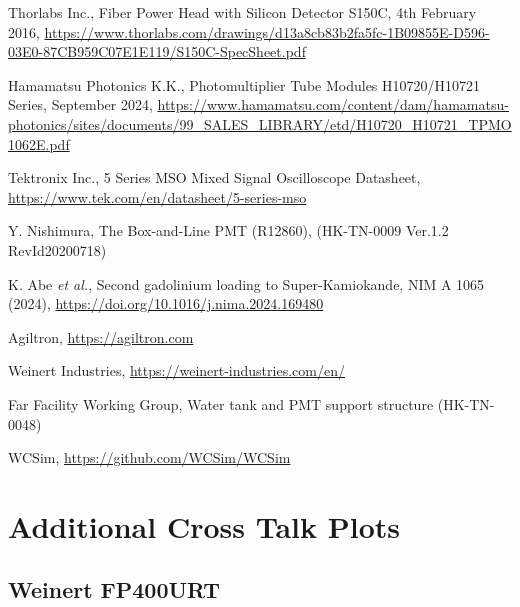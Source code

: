 \documentclass[a4paper,11pt]{article}
\begin{document}
\begin{thebibliography}{99}
Thorlabs Inc., Fiber Power Head with Silicon Detector S150C, 4th February 2016, \url{https://www.thorlabs.com/drawings/d13a8cb83b2fa5fc-1B09855E-D596-03E0-87CB959C07E1E119/S150C-SpecSheet.pdf}

Hamamatsu Photonics K.K., Photomultiplier Tube Modules H10720/H10721 Series, September 2024, \url{https://www.hamamatsu.com/content/dam/hamamatsu-photonics/sites/documents/99_SALES_LIBRARY/etd/H10720_H10721_TPMO1062E.pdf}

Tektronix Inc., 5 Series MSO Mixed Signal Oscilloscope Datasheet, \url{https://www.tek.com/en/datasheet/5-series-mso}

Y. Nishimura, The Box-and-Line PMT (R12860), (HK-TN-0009 Ver.1.2 RevId20200718)

K. Abe {\it et al.}, Second gadolinium loading to Super-Kamiokande, NIM A 1065 (2024), \url{https://doi.org/10.1016/j.nima.2024.169480}


Agiltron, \url{https://agiltron.com}

Weinert Industries, \url{https://weinert-industries.com/en/}


Far Facility Working Group, Water tank and PMT support structure (HK-TN-0048)


WCSim, \url{https://github.com/WCSim/WCSim}

\end{thebibliography}

\clearpage
\newpage
\appendix

\section{Additional Cross Talk Plots}\label{app:crosstalk}

\subsection{Weinert FP400URT}
\end{document}

